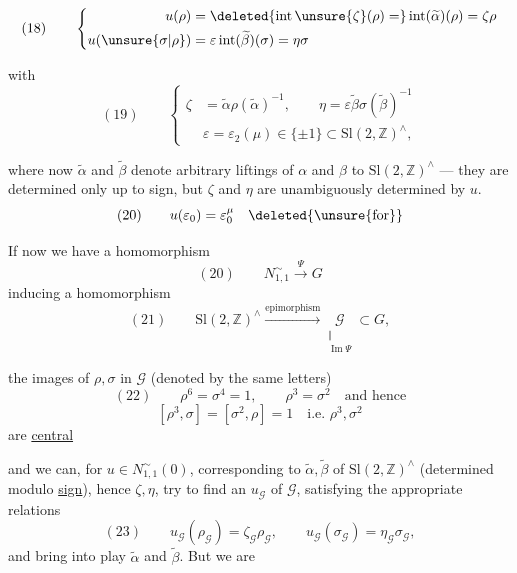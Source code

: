 \[
(18)\qquad
\left\{\begin{aligned}
u(\rho)&=\deleted{\operatorname{int}\unsure{\zeta}(\rho)=}
\operatorname{int}(\widetilde{\alpha})(\rho)=\zeta\rho\\
u(\unsure{\sigma|\rho})&=
\varepsilon\operatorname{int}(\widetilde{\beta})(\sigma)=\eta\sigma
\end{aligned}\right.
\]

with
\[
(19)\qquad
\left\{\begin{aligned}
\zeta&=\widetilde{\alpha}\rho(\widetilde{\alpha})^{-1},\qquad
\eta=\varepsilon\widetilde{\beta}\sigma(\widetilde{\beta})^{-1}\\
&\varepsilon=\varepsilon_2(\mu)\in\{\pm1\}\subset
\mathrm{Sl}(2,\mathbb Z)^\wedge,
\end{aligned}\right.
\]



where now $\widetilde{\alpha}$ and $\widetilde{\beta}$
denote arbitrary liftings of $\alpha$ and $\beta$ to
$\mathrm{Sl}(2,\mathbb Z)^\wedge$ --- they are determined
only up to sign, but
$\zeta$ and $\eta$ are unambiguously determined by $u$.
\[
(20)\qquad u(\varepsilon_0)=\varepsilon_0^\mu
\quad\deleted{\text{\unsure{for}}}
\]

If now we have a  homomorphism
\[
(20)\qquad N_{1,1}^{\sim}\xrightarrow{\Psi}G
\]
inducing a homomorphism
\[
(21)\qquad
\mathrm{Sl}(2,\mathbb Z)^\wedge
\xrightarrow{\text{epimorphism}}
\underset{\substack{\Vert\\\operatorname{Im}\Psi}}{\mathcal{G}}
\subset G,
\]

the images of $\rho,\sigma$ in $\mathcal{G}$
(denoted by the same letters)
\[
(22)\qquad
\rho^6=\sigma^4=1,\qquad
\rho^3=\sigma^2\quad\text{and hence}
\]
\[
[\rho^3,\sigma]=[\sigma^2,\rho]=1
\quad\text{i.e. }\rho^3,\sigma^2
\]
are \uline{central}


and we can, for $u\in N_{1,1}^{\sim}(0)$, corresponding to
 $\widetilde{\alpha},\widetilde{\beta}$ of
$\mathrm{Sl}(2,\mathbb Z)^\wedge$
(determined modulo \uline{sign}), hence $\zeta,\eta$,
try to find an 
$u_{\mathcal{G}}$ of $\mathcal{G}$,
satisfying the appropriate relations
\[
(23)\qquad
u_{\mathcal{G}}(\rho_{\mathcal{G}})
=\zeta_{\mathcal{G}}\rho_{\mathcal{G}},\qquad
u_{\mathcal{G}}(\sigma_{\mathcal{G}})
=\eta_{\mathcal{G}}\sigma_{\mathcal{G}},
\]
and bring into play  $\widetilde{\alpha}$ and
$\widetilde{\beta}$. But we are

